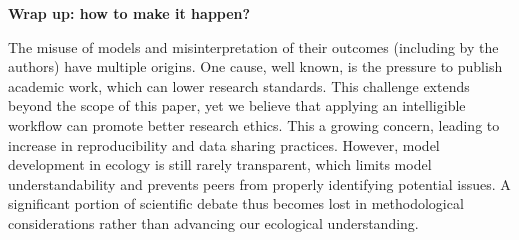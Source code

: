 \documentclass[11pt]{article}
\begin{document}

\vspace{0.5cm}
\noindent \textbf{Wrap up: how to make it happen?}

The misuse of models and misinterpretation of their outcomes (including by the authors) have multiple origins. One cause, well known, is the pressure to publish academic work, which can lower research standards. This challenge extends beyond the scope of this paper, yet we believe that applying an intelligible workflow can promote better research ethics.
This a growing concern, leading to increase in reproducibility and data sharing practices.
However, model development in ecology is still rarely transparent, which limits model understandability and prevents peers from properly identifying potential issues. A significant portion of scientific debate thus becomes lost in methodological considerations rather than advancing our ecological understanding.


\end{document}
